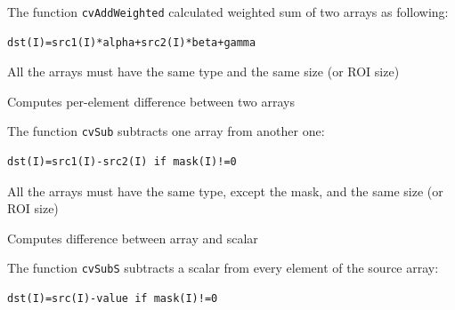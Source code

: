 The function \texttt{cvAddWeighted} calculated weighted sum of two arrays as following:

\begin{lstlisting}
dst(I)=src1(I)*alpha+src2(I)*beta+gamma
\end{lstlisting}

All the arrays must have the same type and the same size (or ROI size)


\label{Sub}

Computes per-element difference between two arrays


\begin{description}
\end{description}


The function \texttt{cvSub} subtracts one array from another one:

\begin{lstlisting}
dst(I)=src1(I)-src2(I) if mask(I)!=0
\end{lstlisting}

All the arrays must have the same type, except the mask, and the same size (or ROI size)

\label{SubS}

Computes difference between array and scalar


\begin{description}
\end{description}

The function \texttt{cvSubS} subtracts a scalar from every element of the source array:

\begin{lstlisting}
dst(I)=src(I)-value if mask(I)!=0
\end{lstlisting}

